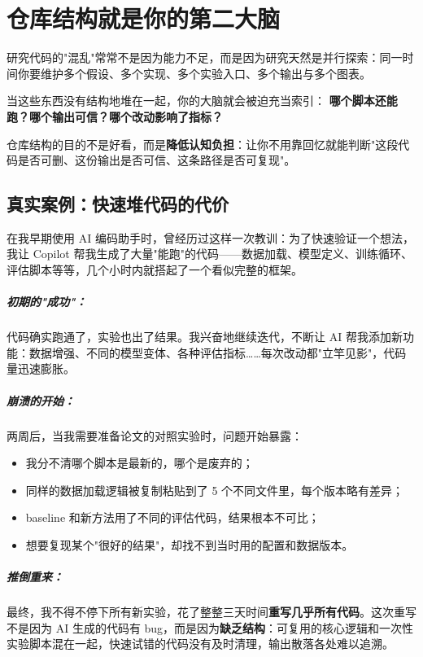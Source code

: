 \chapter{仓库结构就是你的第二大脑}
\label{ch:repo_layout}

研究代码的"混乱"常常不是因为能力不足，而是因为研究天然是并行探索：同一时间你要维护多个假设、多个实现、多个实验入口、多个输出与多个图表。

当这些东西没有结构地堆在一起，你的大脑就会被迫充当索引：
\textbf{哪个脚本还能跑？哪个输出可信？哪个改动影响了指标？}

仓库结构的目的不是好看，而是\textbf{降低认知负担}：让你不用靠回忆就能判断"这段代码是否可删、这份输出是否可信、这条路径是否可复现"。

\section{真实案例：快速堆代码的代价}

在我早期使用 AI 编码助手时，曾经历过这样一次教训：为了快速验证一个想法，我让 Copilot 帮我生成了大量"能跑"的代码——数据加载、模型定义、训练循环、评估脚本等等，几个小时内就搭起了一个看似完整的框架。

\paragraph{初期的"成功"：}代码确实跑通了，实验也出了结果。我兴奋地继续迭代，不断让 AI 帮我添加新功能：数据增强、不同的模型变体、各种评估指标……每次改动都"立竿见影"，代码量迅速膨胀。

\paragraph{崩溃的开始：}两周后，当我需要准备论文的对照实验时，问题开始暴露：
\begin{itemize}
  \item 我分不清哪个脚本是最新的，哪个是废弃的；
  \item 同样的数据加载逻辑被复制粘贴到了 5 个不同文件里，每个版本略有差异；
  \item baseline 和新方法用了不同的评估代码，结果根本不可比；
  \item 想要复现某个"很好的结果"，却找不到当时用的配置和数据版本。
\end{itemize}

\paragraph{推倒重来：}最终，我不得不停下所有新实验，花了整整三天时间\textbf{重写几乎所有代码}。这次重写不是因为 AI 生成的代码有 bug，而是因为\textbf{缺乏结构}：可复用的核心逻辑和一次性实验脚本混在一起，快速试错的代码没有及时清理，输出散落各处难以追溯。

